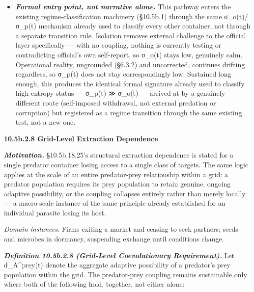 \documentclass[
]{article}
\begin{document}
\begin{itemize}
\item
  \emph{\textbf{Formal entry point, not narrative alone.}} This pathway
  enters the existing regime-classification machinery (§10.5b.1) through
  the same σ\_o(t)/σ\_p(t) mechanism already used to classify every
  other container, not through a separate transition rule. Isolation
  removes external challenge to the official layer specifically --- with
  no coupling, nothing is currently testing or contradicting official's
  own self-report, so σ\_o(t) stays low, genuinely calm. Operational
  reality, ungrounded (§6.3.2) and uncorrected, continues drifting
  regardless, so σ\_p(t) does not stay correspondingly low. Sustained
  long enough, this produces the identical formal signature already used
  to classify high-entropy status --- σ\_p(t) ≫ σ\_o(t) --- arrived at
  by a genuinely different route (self-imposed withdrawal, not external
  predation or corruption) but registered as a regime transition through
  the same existing test, not a new one.
\end{itemize}

\textbf{10.5b.2.8 Grid-Level Extraction Dependence}

\emph{\textbf{Motivation.}} §10.5b.18.25's structural extraction
dependence is stated for a single predator container losing access to a
single class of targets. The same logic applies at the scale of an
entire predator-prey relationship within a grid: a predator population
requires its prey population to retain genuine, ongoing adaptive
possibility, or the coupling collapses entirely rather than merely
locally --- a macro-scale instance of the same principle already
established for an individual parasite losing its host.

\emph{Domain instances.} Firms exiting a market and ceasing to seek
partners; seeds and microbes in dormancy, suspending exchange until
conditions change.

\emph{\textbf{Definition 10.5b.2.8 (Grid-Level Coevolutionary
Requirement).}} Let d\_A\^{}prey(t) denote the aggregate adaptive
possibility of a predator's prey population within the grid. The
predator-prey coupling remains sustainable only where both of the
following hold, together, not either alone:
\end{document}
